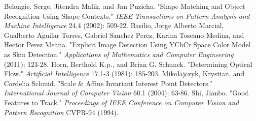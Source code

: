 \documentclass[twoside,twocolumn]{article}
\begin{document}
\begin{thebibliography}{99} %

 Belongie, Serge, Jitendra Malik, and Jan Puzicha. "Shape Matching and Object Recognition Using Shape Contexts." \textit{IEEE Transactions on Pattern Analysis and Machine Intelligence} 24.4 (2002): 509-22.
\newblock {}Basilio, Jorge Alberto Marcial, Gualberto Aguilar Torres, Gabriel Sanchez Perez, Karina Toscano Medina, and Hector Perez Meana. "Explicit Image Detection Using YCbCr Space Color Model as Skin Detection." \textit{Applications of Mathematics and Computer Engineering} (2011): 123-28.
\newblock {} Horn, Berthold K.p., and Brian G. Schunck. "Determining Optical Flow." \textit{Artificial Intelligence} 17.1-3 (1981): 185-203.
\newblock {} Mikolajczyk, Krystian, and Cordelia Schmid. "Scale \& Affine Invariant Interest Point Detectors." \textit{International Journal of Computer Vision} 60.1 (2004): 63-86. 
\newblock {} Shi, Jianbo. "Good 
Features to Track." \textit{Proceedings of IEEE Conference on Computer Vision and Pattern Recognition} CVPR-94 (1994).

\end{thebibliography}

\end{document}
